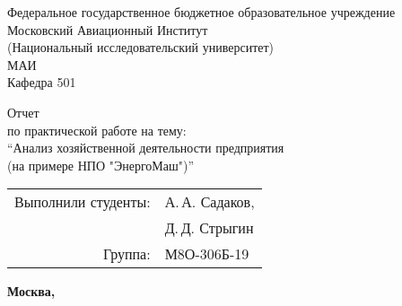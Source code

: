 \begin{titlepage}
\bfseries
\begin{mdframed}
\begin{center}

{\Large Федеральное государственное бюджетное образовательное учреждение\\
Московский Авиационный Институт\\
(Национальный исследовательский университет)\\
МАИ\\
Кафедра 501
}
\vspace{60pt}


Отчет\\
по практической работе на тему:\\
\enquote{Анализ хозяйственной деятельности предприятия\\
(на примере НПО "ЭнергоМаш")}
\end{center}

\vspace{180pt}

\begin{flushright}
\begin{tabular}{rl}
Выполнили студенты: & А.\,А. Садаков,\\
 & Д.\,Д. Стрыгин\\
Группа: & М8О-306Б-19\\
\end{tabular}
\end{flushright}

\vfill

\begin{center}
\bfseries
Москва, \the\year

\end{center}
\end{mdframed}
\end{titlepage}

\pagebreak